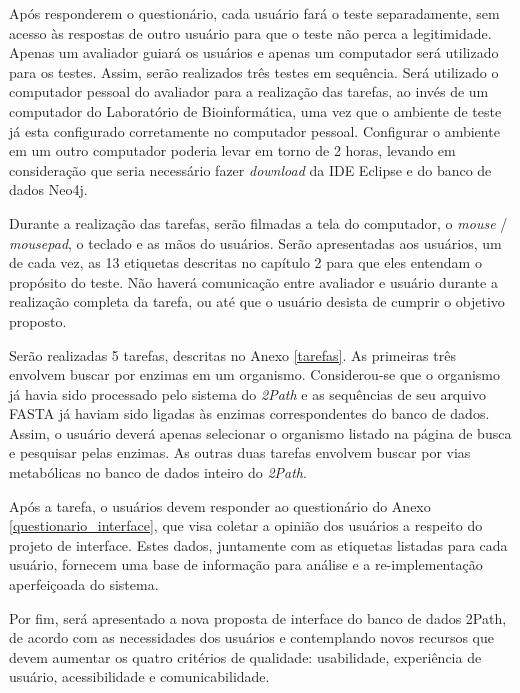 \indent Após responderem o questionário, cada usuário fará o teste separadamente, sem acesso às respostas de outro usuário para que o teste não perca a legitimidade. Apenas um avaliador guiará os usuários e apenas um computador será utilizado para os testes. Assim, serão realizados três testes em sequência. Será utilizado o computador pessoal do avaliador para a realização das tarefas, ao invés de um computador do Laboratório de Bioinformática, uma vez que o ambiente de teste já esta configurado corretamente no computador pessoal. Configurar o ambiente em um outro computador poderia levar em torno de 2 horas, levando em consideração que seria necessário fazer \textit{download} da IDE Eclipse e do banco de dados Neo4j.

\indent Durante a realização das tarefas, serão filmadas a tela do computador, o \textit{mouse} / \textit{mousepad}, o teclado e as mãos do usuários. Serão apresentadas aos usuários, um de cada vez, as 13 etiquetas descritas no capítulo 2 para que eles entendam o propósito do teste. Não haverá comunicação entre avaliador e usuário durante a realização completa da tarefa, ou até que o usuário desista de cumprir o objetivo proposto.

\indent Serão realizadas 5 tarefas, descritas no Anexo \ref{tarefas}. As primeiras três envolvem buscar por enzimas em um organismo. Considerou-se que o organismo já havia sido processado pelo sistema do \textit{2Path} e as sequências de seu arquivo FASTA já haviam sido ligadas às enzimas correspondentes do banco de dados. Assim, o usuário deverá apenas selecionar o organismo listado na página de busca e pesquisar pelas enzimas. As outras duas tarefas envolvem buscar por vias metabólicas no banco de dados inteiro do \textit{2Path}.

\indent Após a tarefa, o usuários devem responder ao questionário do Anexo \ref{questionario_interface}, que visa coletar a opinião dos usuários a respeito do projeto de interface. Estes dados, juntamente com as etiquetas listadas para cada usuário, fornecem uma base de informação para análise e a re-implementação aperfeiçoada do sistema.

\indent Por fim, será apresentado a nova proposta de interface do banco de dados 2Path, de acordo com as necessidades dos usuários e contemplando novos recursos que devem aumentar os quatro critérios de qualidade: usabilidade, experiência de usuário, acessibilidade e comunicabilidade.